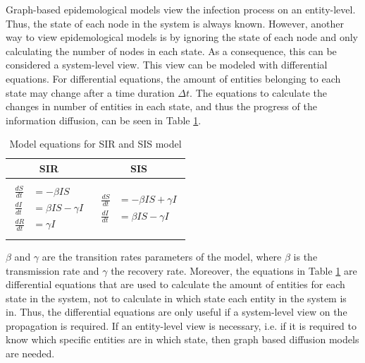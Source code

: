 Graph-based epidemological models view the infection process on an entity-level.
Thus, the state of each node in the system is always known.
However, another way to view epidemological models is by ignoring the 
state of each node and only calculating the number of nodes in each state.
As a consequence, this can be considered a system-level view.
This view can be modeled with differential equations.
For differential equations, the amount of entities belonging to each state may change 
after a time duration $\Delta t$. The equations to calculate the 
changes in number of entities in each state, and thus the progress 
of the information diffusion, can be seen in Table \ref{SI-table-equations}.

\begin{table}[ht!]
    \centering
    \begin{tabular}{|c | c |} 
     \hline
     SIR & SIS  \\ 
     \hline
     & \\
     $\begin{aligned}
          \frac{dS}{dt} &= -\beta I S \\
          \frac{dI}{dt} &= \beta I S - \gamma I \\
          \frac{dR}{dt} &= \gamma I  
        \end{aligned}$
      &
      $\begin{aligned}
          \frac{dS}{dt} &= -\beta I S + \gamma I\\
          \frac{dI}{dt} &= \beta I S - \gamma I
        \end{aligned}$
       \\ 
       & \\
     \hline
    \end{tabular}
    \caption{Model equations for SIR and SIS model \cite{sirequation}}
    \label{SI-table-equations}
\end{table}

$\beta$ and $\gamma$ are the transition rates parameters of the model, where 
$\beta$ is the transmission rate and $\gamma$ the 
recovery rate. Moreover, the equations in Table \ref{SI-table-equations}
are differential equations that are used to calculate the amount
of entities for each state in the system, not to calculate in which state
each entity in the system is in. Thus, the differential equations are 
only useful if a system-level view on the propagation is required.
If an entity-level view is necessary, i.e. if it is required to know which 
specific entities are in which state, then graph based diffusion models are needed.


